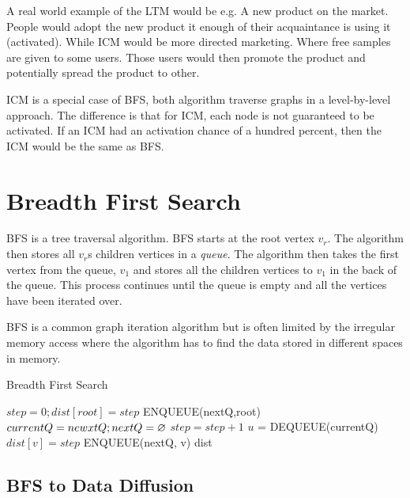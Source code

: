 A real world example of the LTM would be e.g. A new product on the market. People would adopt the new product it enough of their acquaintance is using it (activated). While ICM would be more directed marketing. Where free samples are given to some users. Those users would then promote the product and potentially spread the product to other.

ICM is a special case of BFS, both algorithm traverse graphs in a level-by-level approach. The difference is that for ICM, each node is not guaranteed to be activated. If an ICM had an activation chance of a hundred percent, then the ICM would be the same as BFS.


\section{Breadth First Search}
BFS is a tree traversal algorithm. BFS starts at the root vertex \textit{$v_r$}. The algorithm then stores all $v_r$s children vertices in a \textit{queue}. The algorithm then takes the first vertex from the queue, \textit{$v_1$} and stores all the children vertices to \textit{$v_1$} in the back of the queue. This process continues until the queue is empty and all the vertices have been iterated over. 

BFS is a common graph iteration algorithm but is often limited by the irregular memory access where the algorithm has to find the data stored in different spaces in memory.

\begin{algorithm}
\caption{Breadth First Search}
\begin{algorithmic}[1]
\State $step = 0; dist[root] = step$
\State ENQUEUE(nextQ,root)
\State $currentQ = newxtQ; nextQ = \oldemptyset$
\State $step = step+1$
\State$ u$ = DEQUEUE(currentQ)
\State $dist[v] = step$
\State ENQUEUE(nextQ, v)
\EndIf
\EndFor
\EndWhile
\EndWhile
\Return dist
\end{algorithmic}
\end{algorithm}


 
\subsection{BFS to Data Diffusion}

